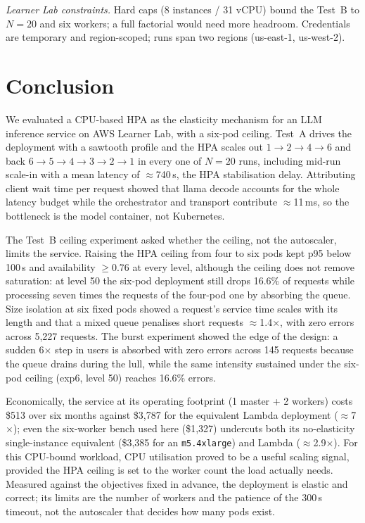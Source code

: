 \documentclass[conference]{IEEEtran}
\newcommand{\code}[1]{\texttt{#1}}
\begin{document}
\emph{Learner Lab constraints.} Hard caps (8 instances / 31 vCPU) bound the
Test~B to $N{=}20$ and six workers; a full factorial would need more
headroom. Credentials are temporary and region-scoped; runs span two regions
(us-east-1, us-west-2).

\section{Conclusion}
\label{sec:conclusion}

We evaluated a CPU-based HPA as the elasticity mechanism for an LLM inference
service on AWS Learner Lab, with a six-pod ceiling. Test~A drives the
deployment with a sawtooth profile and the HPA scales out
$1{\to}2{\to}4{\to}6$ and back $6{\to}5{\to}4{\to}3{\to}2{\to}1$ in every one
of $N{=}20$ runs, including mid-run scale-in with a mean latency of
$\approx$740\,s, the HPA stabilisation delay. Attributing client wait time
per request showed that llama decode accounts for the whole latency budget
while the orchestrator and transport contribute $\approx$11\,ms, so the
bottleneck is the model container, not Kubernetes.

The Test~B ceiling experiment asked whether the ceiling, not the autoscaler,
limits the service. Raising the HPA ceiling from four to six pods kept p95
below 100\,s and availability $\ge$0.76 at every level, although the ceiling
does not remove saturation: at level 50 the six-pod deployment still drops
16.6\% of requests while processing seven times the requests of the four-pod
one by absorbing the queue. Size isolation at six fixed pods showed a
request's service time scales with its length and that a mixed queue
penalises short requests $\approx$1.4$\times$, with zero errors across
5{,}227 requests. The burst experiment showed the edge of the design: a
sudden 6$\times$ step in users is absorbed with zero errors across 145
requests because the queue drains during the lull, while the same intensity
sustained under the six-pod ceiling (exp6, level 50) reaches 16.6\% errors.

Economically, the service at its operating footprint (1 master + 2 workers)
costs \$513 over six months against \$3{,}787 for the equivalent Lambda
deployment ($\approx$7$\times$); even the six-worker bench used here
(\$1{,}327) undercuts both its no-elasticity single-instance equivalent
(\$3{,}385 for an \code{m5.4xlarge}) and Lambda ($\approx$2.9$\times$). For
this CPU-bound workload, CPU utilisation proved
to be a useful scaling signal, provided the HPA ceiling is set to the
worker count the load actually needs. Measured against the objectives fixed
in advance, the deployment is elastic and correct; its limits are the number
of workers and the patience of the 300\,s timeout, not the autoscaler that
decides how many pods exist.
\end{document}
